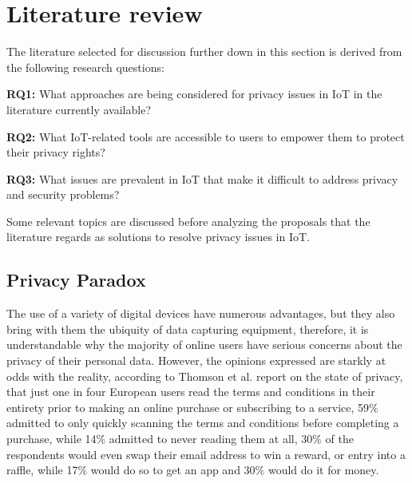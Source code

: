 \documentclass[conference]{IEEEtran}
\begin{document}
\section{Literature review}

The literature selected for discussion further down in this section is derived
from the following research questions:

\textbf{RQ1:} What approaches are being considered for privacy issues in IoT
in the literature currently available?

\textbf{RQ2:} What IoT-related tools are accessible to users to empower them
to protect their privacy rights?

\textbf{RQ3:} What issues are prevalent in IoT that make it difficult to address
privacy and security problems?

Some relevant topics are discussed before analyzing the proposals that the
literature regards as solutions to resolve privacy issues in IoT.

\subsection{Privacy Paradox}

The use of a variety of digital devices have numerous advantages, but they also
bring with them the ubiquity of data capturing equipment, therefore, it is
understandable why the majority of online users have serious concerns about
the privacy of their personal data. However, the opinions expressed are starkly
at odds with the reality, according to Thomson et al. \cite{DarrenState} report
on the state of privacy, that just one in four European users read the terms
and conditions in their entirety prior to making an online purchase or
subscribing to a service, 59\% admitted to only quickly scanning the terms and
conditions before completing a purchase, while 14\% admitted to never reading
them at all, 30\% of the respondents would even swap their email address to win
a reward, or entry into a raffle, while 17\% would do so to get an app and 30\%
would do it for money.
\end{document}
